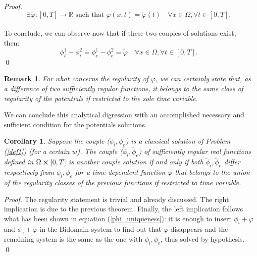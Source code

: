 \documentclass[a4paper,11pt]{article}
\newtheorem*{remark}{Remark}
\newtheorem{corollary}{Corollary}
\begin{document}
\begin{proof}
	\begin{equation*}
	\exists \tilde{\varphi}:[0,T]\rightarrow \mathbb{R} \text{ such that } \varphi(x,t) = \tilde{\varphi}(t) \quad \forall x \in \Omega,\forall t \in [0,T].
	\end{equation*}\\
	To conclude, we can observe now that if these two couples of solutions exist, then:
	\begin{equation*}
	\phi_i^1-\phi_i^2 = \phi_e^1-\phi_e^2=\tilde{\varphi} \quad \forall x \in \Omega, \forall t \in [0,T].
	\end{equation*} \qed
\end{proof}

\begin{remark}
For what concerns the regularity of $\varphi$, we can certainly state that, as a difference of two sufficiently regular functions, it belongs to the same class of regularity of the potentials if restricted to the sole time variable.
\end{remark}

\vspace{4mm}
\noindent We can conclude this analytical digression with an accomplished necessary and sufficient condition for the potentials solutions. \vspace{4mm}

\begin{corollary}
Suppose the couple ($\phi_i,\phi_e$) is a classical solution of Problem (\ref{def1}) (for a certain $w$). The couple ($\tilde{\phi}_i,\tilde{\phi}_e$) of sufficiently regular real functions defined in $\Omega\cross[0,T]$ is another couple solution if and only if both $\tilde{\phi}_i,\tilde{\phi}_e$ differ respectively from $\phi_i,\phi_e$ for a time-dependent function $\varphi$ that belongs to the union of the regularity classes of the previous functions if restricted to time variable.
\end{corollary}

\begin{proof}
	The regularity statement is trivial and already discussed. The right implication is due to the previous theorem. Finally, the left implication follows what has been shown in equation (\ref{phi_uniqueness}): it is enough to insert $\phi_i+\varphi$ and $\phi_e+\varphi$ in the Bidomain system to find out that $\varphi$ disappears and the remaining system is the same as the one with $\phi_i,\phi_e$, thus solved by hypothesis. \qed
\end{proof}
\end{document}
